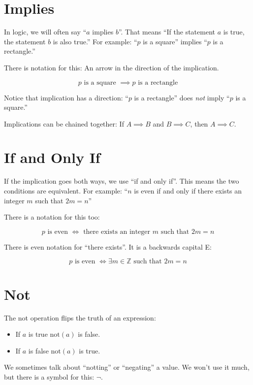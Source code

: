 \section{Implies}

In logic, we will often say ``$a$ implies $b$''.  That means ``If the
statement $a$ is true, the statement $b$ is also true.''  For example:
``$p$ is a square'' implies ``$p$ is a rectangle.''

There is notation for this: An arrow in the direction of the implication.

$$p \text{ is a square } \implies p \text{ is a rectangle}$$

Notice that implication has a direction: ``$p$ is a rectangle'' does \textit{not} imply 
``$p$ is a square.''

Implications can be chained together: If $A \implies B$ and $B \implies C$,  then $A \implies C$.

\section {If and Only If}

If the implication goes both ways, we use ``if and only if''.  This
means the two conditions are equivalent.  For example: ``$n$ is even
if and only if there exists an integer $m$ such that $2m = n$'' 

There is a notation for this too:

$$p \text{ is even } \iff \text{ there exists an integer } m \text{ such that } 2m = n$$

There is even notation for ``there exists''. It is a backwards capital E:

$$p \text{ is even } \iff \exists m \in \mathbb{Z}  \text{ such that } 2m = n$$

\section {Not}

The not operation flips the truth of an expression:
\begin{itemize}
\item If $a$ is true $\text{not}(a)$ is false.

\item If $a$ is false $\text{not}(a)$ is true.
\end{itemize}

We sometimes talk about ``notting'' or ``negating'' a value.  We won't
use it much, but there is a symbol for this: $\neg$.

